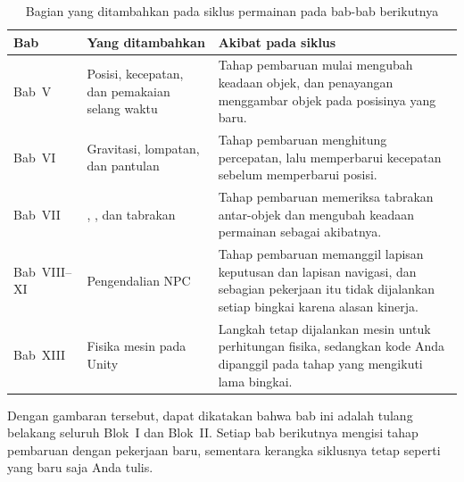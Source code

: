 \begin{table}[htbp]
\centering
\caption{Bagian yang ditambahkan pada siklus permainan pada bab-bab berikutnya}
\label{tab:perkembangan-siklus}
{\setlength{\tabcolsep}{4pt}\footnotesize%
\begin{tabularx}{\textwidth}{@{}C{1.6cm} L{4.6cm} Y@{}}
\toprule
\headrow \textbf{Bab} & \textbf{Yang ditambahkan} & \textbf{Akibat pada siklus} \\
\midrule
Bab~V & Posisi, kecepatan, dan pemakaian selang waktu &
Tahap pembaruan mulai mengubah keadaan objek, dan penayangan menggambar objek
pada posisinya yang baru. \\
\addlinespace
Bab~VI & Gravitasi, lompatan, dan pantulan &
Tahap pembaruan menghitung percepatan, lalu memperbarui kecepatan sebelum
memperbarui posisi. \\
\addlinespace
Bab~VII & , , dan tabrakan &
Tahap pembaruan memeriksa tabrakan antar-objek dan mengubah keadaan permainan
sebagai akibatnya. \\
\addlinespace
Bab~VIII--XI & Pengendalian NPC &
Tahap pembaruan memanggil lapisan keputusan dan lapisan navigasi, dan sebagian
pekerjaan itu tidak dijalankan setiap bingkai karena alasan kinerja. \\
\addlinespace
Bab~XIII & Fisika mesin pada Unity &
Langkah tetap dijalankan mesin untuk perhitungan fisika, sedangkan kode Anda
dipanggil pada tahap yang mengikuti lama bingkai. \\
\bottomrule
\end{tabularx}}
\end{table}

Dengan gambaran tersebut, dapat dikatakan bahwa bab ini adalah tulang
belakang seluruh Blok~I dan Blok~II. Setiap bab berikutnya mengisi tahap
pembaruan dengan pekerjaan baru, sementara kerangka siklusnya tetap seperti
yang baru saja Anda tulis.
